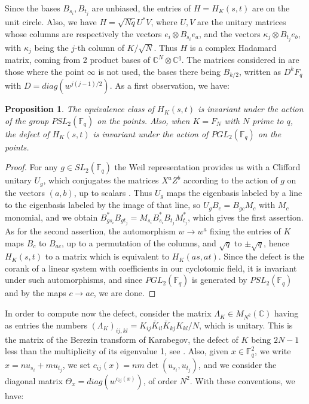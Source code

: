 \documentclass[11pt]{amsart}
\newtheorem{proposition}[theorem]{Proposition}
\theoremstyle{definition}
\begin{document}
Since the bases $B_{s_i},B_{t_j}$ are unbiased, the entries of $H=H_K(s,t)$ are on the unit circle. Also, we have $H=\sqrt{Nq}U^*V$, where $U,V$ are the unitary matrices whose columns are respectively the vectors $e_i\otimes B_{s_i}e_a$, and the vectors $\kappa_j\otimes B_{t_j}e_b$, with $\kappa_j$ being the $j$-th column of $K/\sqrt{N}$. Thus $H$ is a complex Hadamard matrix, coming from 2 product bases of $\mathbb C^N\otimes\mathbb C^q$. The matrices considered in \cite{bop} are those where the point $\infty$ is not used, the bases there being $B_{k/2}$, written as $D^kF_q$ with $D=diag(w^{j(j-1)/2})$. As a first observation, we have:

\begin{proposition}\label{psym}
The equivalence class of $H_K(s,t)$ is invariant under the action of the group $PSL_2(\mathbb F_q)$ on the points. Also, when $K=F_N$ with $N$ prime to $q$, the defect of $H_K(s,t)$ is invariant under the action of $PGL_2(\mathbb F_q)$ on the points.
\end{proposition}

\begin{proof}
For any $g\in SL_2(\mathbb F_q)$ the Weil representation provides us with a Clifford unitary $U_g$, which conjugates the matrices $X^aZ^b$ according to the action of $g$ on the vectors $(a,b)$, up to scalars \cite{app}. Thus $U_g$ maps the eigenbasis labeled by a line to the eigenbasis labeled by the image of that line, so $U_gB_c=B_{gc}M_c$ with $M_c$ monomial, and we obtain $B_{gs_i}^*B_{gt_j}=M_{s_i}B_{s_i}^*B_{t_j}M_{t_j}^*$, which gives the first assertion. As for the second assertion, the automorphism $w\to w^a$ fixing the entries of $K$ maps $B_c$ to $B_{ac}$, up to a permutation of the columns, and $\sqrt{q}$ to $\pm\sqrt{q}$, hence $H_K(s,t)$ to a matrix which is equivalent to $H_K(as,at)$. Since the defect is the corank of a linear system with coefficients in our cyclotomic field, it is invariant under such automorphisms, and since $PGL_2(\mathbb F_q)$ is generated by $PSL_2(\mathbb F_q)$ and by the maps $c\to ac$, we are done.
\end{proof}

In order to compute now the defect, consider the matrix $\Lambda_K\in M_{N^2}(\mathbb C)$ having as entries the numbers $(\Lambda_K)_{ij,kl}=K_{ij}\bar{K}_{il}\bar{K}_{kj}K_{kl}/N$, which is unitary. This is the matrix of the Berezin transform of Karabegov, the defect of $K$ being $2N-1$ less than the multiplicity of its eigenvalue 1, see \cite{tad}. Also, given $x\in\mathbb F_q^2$, we write $x=nu_{s_i}+mu_{t_j}$, we set $c_{ij}(x)=nm\det(u_{s_i},u_{t_j})$, and we consider the diagonal matrix $\Theta_x=diag(w^{c_{ij}(x)})$, of order $N^2$. With these conventions, we have:
\end{document}
